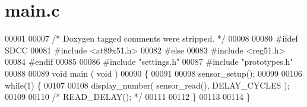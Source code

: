 \section{main.c}

\begin{DoxyCode}
00001 
00007 \textcolor{comment}{/* Doxygen tagged comments were stripped. */}
00008 
00080 \textcolor{preprocessor}{#ifdef SDCC}
00081 \textcolor{preprocessor}{}\textcolor{preprocessor}{#include <at89x51.h>}
00082 \textcolor{preprocessor}{#else}
00083 \textcolor{preprocessor}{}\textcolor{preprocessor}{#include <reg51.h>}
00084 \textcolor{preprocessor}{#endif}
00085 \textcolor{preprocessor}{}
00086 \textcolor{preprocessor}{#include "settings.h"}
00087 \textcolor{preprocessor}{#include "prototypes.h"}
00088 
00089 \textcolor{keywordtype}{void} main ( \textcolor{keywordtype}{void} )
00090 \{
00091 
00098   sensor_setup();
00099 
00106   \textcolor{keywordflow}{while}(1) \{
00107 
00108     display_number( sensor_read(), DELAY_CYCLES );
00109 
00110     \textcolor{comment}{/* READ\_DELAY(); */}
00111 
00112   \}
00113 
00114 \}
\end{DoxyCode}

